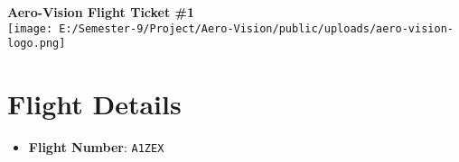 \documentclass[a4paper,12pt]{article}
\begin{document}
\begin{center}
  {\LARGE \textbf{Aero-Vision Flight Ticket \#1}} \\
  \vspace{0.5cm}
  \texttt{[image: E:/Semester-9/Project/Aero-Vision/public/uploads/aero-vision-logo.png]}
\end{center}
\vspace{0.5cm}
\section*{Flight Details}
\begin{itemize}
  \item \textbf{Flight Number}: \texttt{A1ZEX}
\end{itemize}
\end{document}
